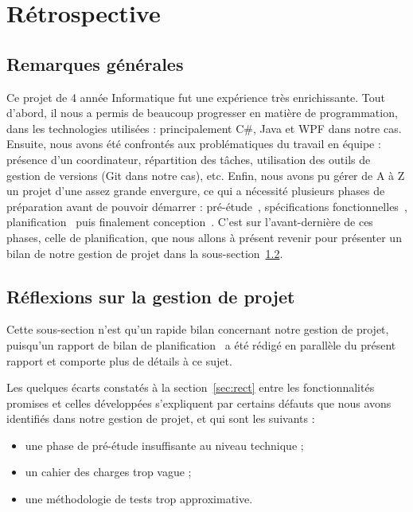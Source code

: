 \section{Rétrospective}
\label{sec:retro}

\subsection{Remarques générales}
\label{ssec:rq_gen}

Ce projet de 4\ieme{} année Informatique fut une expérience très enrichissante. Tout d'abord, il nous a permis de beaucoup progresser en matière de programmation, dans les technologies utilisées : principalement C\#, Java et WPF dans notre cas. Ensuite, nous avons été confrontés aux problématiques du travail en équipe : présence d'un coordinateur, répartition des tâches, utilisation des outils de gestion de versions (Git dans notre cas), etc. Enfin, nous avons pu gérer de A à Z un projet d'une assez grande envergure, ce qui a nécessité plusieurs phases de préparation avant de pouvoir démarrer : pré-étude~\cite{pre_etude}, spécifications fonctionnelles~\cite{spec_fonc}, planification~\cite{planif} puis finalement conception~\cite{conception}. C'est sur l'avant-dernière de ces phases, celle de planification, que nous allons à présent revenir pour présenter un bilan de notre gestion de projet dans la {\sc sous-section}~\ref{ssec:gestionProjet}.

\subsection{Réflexions sur la gestion de projet}
\label{ssec:gestionProjet}

Cette sous-section n'est qu'un rapide bilan concernant notre gestion de projet, puisqu'un rapport de bilan de planification~\cite{bilanPlanif} a été rédigé en parallèle du présent rapport et comporte plus de détails à ce sujet.

Les quelques écarts constatés à la {\sc section}~\ref{sec:rect} entre les fonctionnalités promises et celles développées s'expliquent par certains défauts que nous avons identifiés dans notre gestion de projet, et qui sont les suivants : 

\begin{itemize}
\item une phase de pré-étude insuffisante au niveau technique ;
\item un cahier des charges trop vague ;
\item une méthodologie de tests trop approximative.
\end{itemize}

